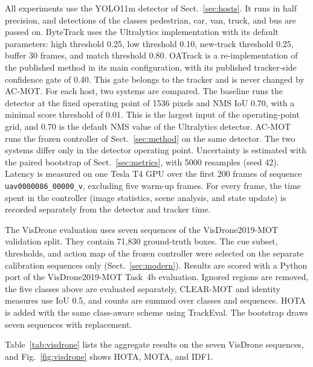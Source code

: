 \documentclass[pdflatex,sn-mathphys-num,iicol]{sn-jnl}
\makeatletter
\def\subsectionfont{\reset@font\fontfamily{\rmdefault}\fontsize{10bp}{12bp}\bfseries\selectfont\raggedright\boldmath}
\renewcommand\subsection{\@startsection{subsection}{2}{\z@}{-7pt \@plus -2pt \@minus -2pt}{3pt}{\subsectionfont}}
\makeatother
\begin{document}
All experiments use the YOLO11m detector of Sect.~\ref{sec:hosts}. It runs in
half precision, and detections of the classes pedestrian, car, van, truck, and
bus are passed on. ByteTrack uses the Ultralytics implementation with its
default parameters: high threshold 0.25, low threshold 0.10, new-track
threshold 0.25, buffer 30 frames, and match threshold 0.80. OATrack is a
re-implementation of the published method \cite{qi2026oatrack} in its main
configuration, with its published tracker-side confidence gate of 0.40. This
gate belongs to the tracker and is never changed by AC-MOT. For each host, two
systems are compared. The baseline runs the detector at the fixed operating
point of 1536 pixels and NMS IoU 0.70, with a minimal score threshold of 0.01.
This is the largest input of the operating-point grid, and 0.70 is the default
NMS value of the Ultralytics detector. AC-MOT runs the frozen controller of
Sect.~\ref{sec:method} on the same detector. The two systems differ only in
the detector operating point. Uncertainty is estimated with the paired
bootstrap of Sect.~\ref{sec:metrics}, with 5000 resamples (seed 42).
Latency is measured on one Tesla T4 GPU over the first 200 frames of sequence
\texttt{uav0000086\_00000\_v}, excluding five warm-up frames. For every
frame, the time spent in the controller (image statistics, scene analysis, and
state update) is recorded separately from the detector and tracker time.

\subsection{Frozen VisDrone evaluation}
The VisDrone evaluation uses seven sequences of the VisDrone2019-MOT
validation split. They contain 71,830 ground-truth boxes. The cue subset,
thresholds, and action map of the frozen controller were selected on the
separate calibration sequences only (Sect.~\ref{sec:modern}). Results are
scored with a Python port of the VisDrone2019-MOT Task~4b evaluation. Ignored
regions are removed, the five classes above are evaluated separately,
CLEAR-MOT and identity measures use IoU 0.5, and counts are summed over
classes and sequences. HOTA is added with the same class-aware scheme using
TrackEval. The bootstrap draws seven sequences with replacement.

Table~\ref{tab:visdrone} lists the aggregate results on the seven VisDrone
sequences, and Fig.~\ref{fig:visdrone} shows HOTA, MOTA, and IDF1.
\end{document}
